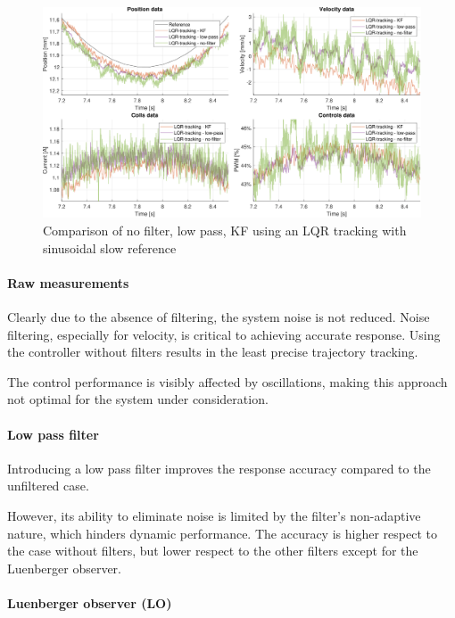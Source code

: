 \begin{figure}[H]
    \centering
    \includegraphics[width=1\linewidth]{./img/MATLAB/results/sinusoidal_slow_linear_zoomed_star_no_filter_low_pass_KF.pdf}
    \caption{Comparison of no filter, low pass, KF using an LQR tracking with sinusoidal slow reference}
\end{figure}


\paragraph{Raw measurements}

Clearly due to the absence of filtering, the system noise is not reduced.
Noise filtering, especially for velocity, is critical to achieving accurate response.
Using the controller without filters results in the least precise trajectory tracking.

The control performance is visibly affected by oscillations, making this approach not optimal for the system under consideration.

\paragraph{Low pass filter}

Introducing a low pass filter improves the response accuracy compared to the unfiltered case.

However, its ability to eliminate noise is limited by the filter's non-adaptive nature, which hinders dynamic performance.
The accuracy is higher respect to the case without filters, but lower respect to the other filters except for the Luenberger observer.

\paragraph{Luenberger observer (LO)}

